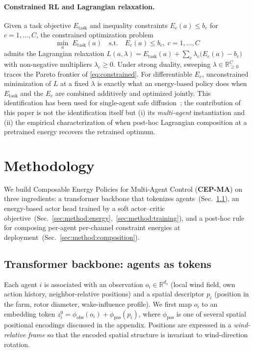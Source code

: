 \documentclass{article}
\begin{document}
\paragraph{Constrained RL and Lagrangian relaxation.}
Given a task objective $E_\text{task}$ and inequality constraints $E_c(a) \leq b_c$ for $c = 1, \ldots, C$, the constrained optimization problem
\begin{equation}
\min_a\; E_\text{task}(a) \quad \text{s.t.} \quad E_c(a) \leq b_c,\; c=1, \ldots, C
\label{eq:constrained}
\end{equation}
admits the Lagrangian relaxation $L(a, \lambda) = E_\text{task}(a) + \sum_c \lambda_c \bigl(E_c(a) - b_c\bigr)$ with non-negative multipliers $\lambda_c \geq 0$. Under strong duality, sweeping $\lambda \in \mathbb{R}^C_{\geq 0}$ traces the Pareto frontier of \eqref{eq:constrained}. For differentiable $E_c$, unconstrained minimization of $L$ at a fixed $\lambda$ is exactly what an energy-based policy does when $E_\text{task}$ and the $E_c$ are combined additively and optimized jointly. This identification has been used for single-agent safe diffusion~\citep{algd2026}; the contribution of this paper is not the identification itself but (i) its \emph{multi-agent} instantiation and (ii) the empirical characterization of when post-hoc Lagrangian composition at a pretrained energy recovers the retrained optimum.


\section{Methodology}
\label{sec:methodology}

We build Composable Energy Policies for Multi-Agent Control (\textbf{CEP-MA}) on three ingredients: a transformer backbone that tokenizes agents~(Sec.~\ref{sec:method:backbone}), an energy-based actor head trained by a soft actor--critic objective~(Sec.~\ref{sec:method:energy},~\ref{sec:method:training}), and a post-hoc rule for composing per-agent per-channel constraint energies at deployment~(Sec.~\ref{sec:method:composition}).

\subsection{Transformer backbone: agents as tokens}
\label{sec:method:backbone}

Each agent $i$ is associated with an observation $o_i \in \mathbb{R}^{d_o}$ (local wind field, own action history, neighbor-relative positions) and a spatial descriptor $p_i$ (position in the farm, rotor diameter, wake-influence profile). We first map $o_i$ to an embedding token $z_i^0 = \phi_\text{obs}(o_i) + \phi_\text{pos}(p_i)$, where $\phi_\text{pos}$ is one of several spatial positional encodings discussed in the appendix. Positions are expressed in a \emph{wind-relative frame} so that the encoded spatial structure is invariant to wind-direction rotation.
\end{document}
